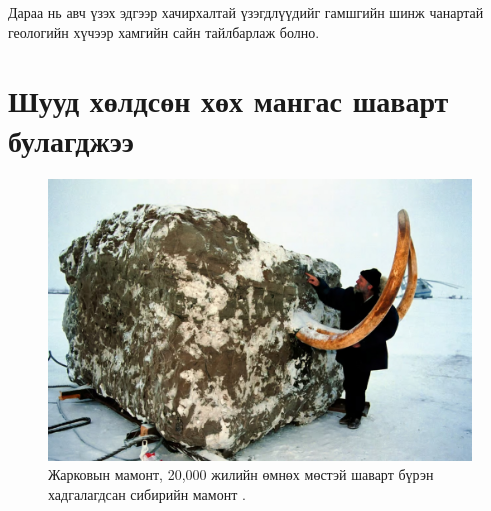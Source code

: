 \documentclass[10pt,twocolumn,letterpaper]{article}
\begin{document}
Дараа нь авч үзэх эдгээр хачирхалтай үзэгдлүүдийг гамшгийн шинж чанартай геологийн хүчээр хамгийн сайн тайлбарлаж болно.

\section{Шууд хөлдсөн хөх мангас шаварт булагджээ}

\begin{figure}[t]
\begin{center}
   \includegraphics[width=1\linewidth]{jarkov-mammoth.jpg}
\end{center}
   \caption{Жарковын мамонт, 20,000 жилийн өмнөх мөстэй шаварт бүрэн хадгалагдсан сибирийн мамонт \cite{51}.}
\label{fig:1}
\label{fig:onecol}
\end{figure}
\end{document}
